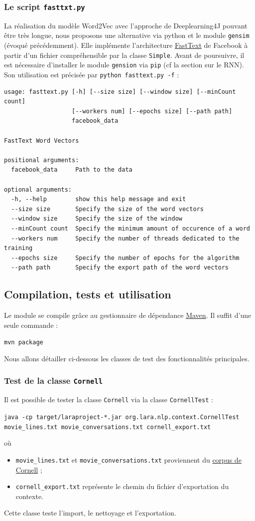 \documentclass[10pt,a4paper]{article}
\begin{document}
\subsubsection{Le script \texttt{fasttxt.py}}
La réalisation du modèle Word2Vec avec l'approche de Deeplearning4J pouvant être très longue, nous proposons une alternative via python et le module \texttt{gensim} (évoqué précédemment). Elle implémente l'architecture \href{https://fasttext.cc/}{FastText} de Facebook à partir d'un fichier compréhensible par la classe \texttt{Simple}. Avant de poursuivre, il est nécessaire d'installer le module \texttt{gension} via \texttt{pip} (cf la section sur le RNN). Son utilisation est précisée par \texttt{python fasttext.py -f} :
\begin{verbatim}
usage: fasttext.py [-h] [--size size] [--window size] [--minCount count]
                   [--workers num] [--epochs size] [--path path]
                   facebook_data

FastText Word Vectors

positional arguments:
  facebook_data     Path to the data

optional arguments:
  -h, --help        show this help message and exit
  --size size       Specify the size of the word vectors
  --window size     Specify the size of the window
  --minCount count  Specify the minimum amount of occurence of a word
  --workers num     Specify the number of threads dedicated to the training
  --epochs size     Specify the number of epochs for the algorithm
  --path path       Specify the export path of the word vectors
\end{verbatim}
\subsection{Compilation, tests et utilisation}
Le module se compile grâce au gestionnaire de dépendance \href{https://maven.apache.org/}{Maven}. Il suffit d'une seule commande :
\begin{center}
\texttt{mvn package}
\end{center}
Nous allons détailler ci-dessous les classes de test des fonctionnalités principales.
\subsubsection{Test de la classe \texttt{Cornell}}
Il est possible de tester la classe \texttt{Cornell} via la classe \texttt{CornellTest} :
\begin{center}
\texttt{java -cp target/laraproject-*.jar org.lara.nlp.context.CornellTest movie\_lines.txt movie\_conversations.txt cornell\_export.txt}
\end{center}
où
\begin{itemize}
\item \texttt{movie\_lines.txt} et \texttt{movie\_conversations.txt} proviennent du \href{https://www.cs.cornell.edu/~cristian/Cornell_Movie-Dialogs_Corpus.html}{corpus de Cornell} ;
\item \texttt{cornell\_export.txt} représente le chemin du fichier d'exportation du contexte.
\end{itemize}
Cette classe teste l'import, le nettoyage et l'exportation.
\end{document}
